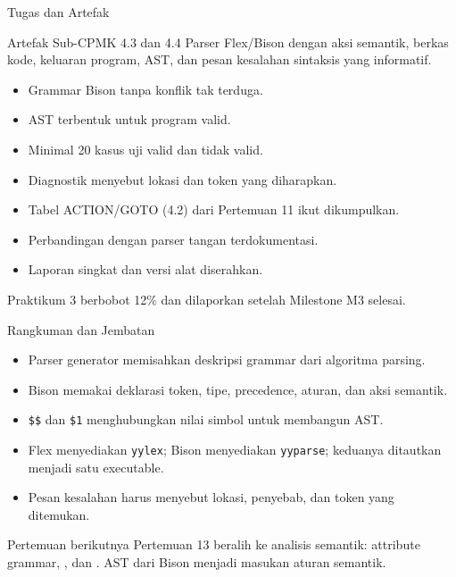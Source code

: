 \documentclass[aspectratio=169,10pt,t]{beamer}
\begin{document}
\begin{frame}{Tugas dan Artefak}
  \begin{block}{Artefak Sub-CPMK 4.3 dan 4.4}
    Parser Flex/Bison dengan aksi semantik, berkas kode, keluaran
    program, AST, dan pesan kesalahan sintaksis yang informatif.
  \end{block}

  \small
  \begin{itemize}
    \item Grammar Bison tanpa konflik tak terduga.
    \item AST terbentuk untuk program valid.
    \item Minimal 20 kasus uji valid dan tidak valid.
    \item Diagnostik menyebut lokasi dan token yang diharapkan.
    \item Tabel ACTION/GOTO (4.2) dari Pertemuan 11 ikut dikumpulkan.
    \item Perbandingan dengan parser tangan terdokumentasi.
    \item Laporan singkat dan versi alat diserahkan.
  \end{itemize}

  \vspace{3pt}
  {\footnotesize\color{ubbblue!75}Praktikum 3 berbobot 12\% dan
  dilaporkan setelah Milestone M3 selesai.}
\end{frame}

\begin{frame}{Rangkuman dan Jembatan}
  \begin{itemize}
    \item Parser generator memisahkan deskripsi grammar dari algoritma
          parsing.
    \item Bison memakai deklarasi token, tipe, precedence, aturan, dan
          aksi semantik.
    \item \texttt{\$\$} dan \texttt{\$1} menghubungkan nilai simbol
          untuk membangun AST.
    \item Flex menyediakan \texttt{yylex}; Bison menyediakan
          \texttt{yyparse}; keduanya ditautkan menjadi satu
          executable.
    \item Pesan kesalahan harus menyebut lokasi, penyebab, dan token
          yang ditemukan.
  \end{itemize}

  \vspace{4pt}
  \begin{exampleblock}{Pertemuan berikutnya}
    Pertemuan 13 beralih ke analisis semantik: attribute grammar,
    , dan .
    AST dari Bison menjadi masukan aturan semantik.
  \end{exampleblock}
\end{frame}
\end{document}
